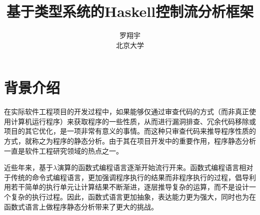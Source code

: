 \documentclass[12pt, titlepage]{article}
\title{基于类型系统的Haskell控制流分析框架}
\author{罗翔宇\\北京大学}
\begin{document}
	\maketitle
	\section{背景介绍}
	在实际软件工程项目的开发过程中，如果能够仅通过审查代码的方式（而非真正使用计算机运行程序）来获取程序的一些性质，从而进行漏洞排查、冗余代码移除或项目的其它优化，是一项非常有意义的事情。而这种只审查代码来推导程序性质的方式，就称之为程序的静态分析。由于其在项目开发中的重要作用，程序静态分析一直是软件工程研究领域的热点之一。
	
	近些年来，基于$\lambda$演算的函数式编程语言逐渐开始流行开来。函数式编程语言相对于传统的命令式编程语言，更加强调程序执行的结果而非程序执行的过程，倡导利用若干简单的执行单元让计算结果不断渐进，逐层推导复杂的运算，而不是设计一个复杂的执行过程。因此，函数式语言更加抽象，表达能力更为强大，同时也为在函数式语言上做程序静态分析带来了更大的挑战。
	
\end{document}
